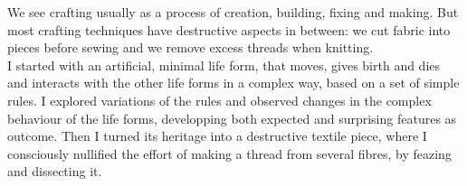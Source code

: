 \documentclass{scrartcl}
\begin{document}
We see crafting usually as a process of creation, building, fixing and making. But most crafting techniques have destructive aspects in between: we cut fabric into pieces before sewing and we remove excess threads when knitting.\\
I started with an artificial, minimal life form, that moves, gives birth and dies and interacts with the other life forms in a complex way, based on a set of simple rules. I explored variations of the rules and observed changes in the complex behaviour of the life forms, developping both expected and surprising features as outcome.
Then I turned its heritage into a destructive textile piece, where I consciously nullified the effort of making a thread from several fibres, by feazing and dissecting it.




\end{document}
